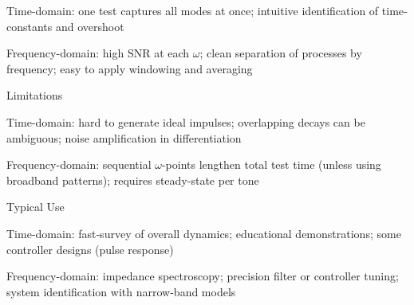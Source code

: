 Time-domain: one test captures all modes at once; intuitive identification of time‐constants and overshoot\

Frequency-domain: high SNR at each $\omega$; clean separation of processes by frequency; easy to apply windowing and averaging\

Limitations\

Time-domain: hard to generate ideal impulses; overlapping decays can be ambiguous; noise amplification in differentiation\

Frequency-domain: sequential $\omega$-points lengthen total test time (unless using broadband patterns); requires steady-state per tone\

Typical Use\

Time-domain: fast‐survey of overall dynamics; educational demonstrations; some controller designs (pulse response)\

Frequency-domain: impedance spectroscopy; precision filter or controller tuning; system identification with narrow-band models\


